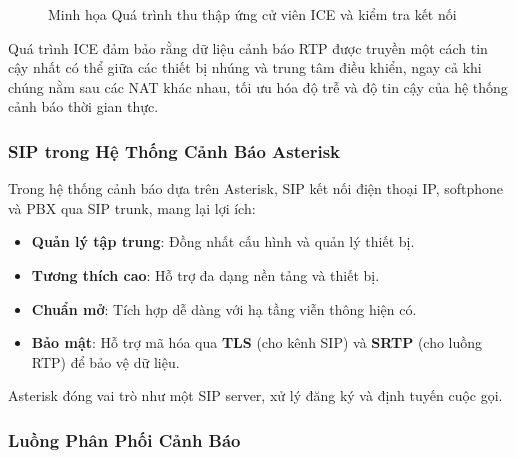 \begin{figure}[h]
\caption{Minh họa Quá trình thu thập ứng cử viên ICE và kiểm tra kết nối}
\label{fig:ice_flow_symmetric}
\end{figure}

Quá trình ICE đảm bảo rằng dữ liệu cảnh báo RTP được truyền một cách tin cậy nhất có thể giữa các thiết bị nhúng và trung tâm điều khiển, ngay cả khi chúng nằm sau các NAT khác nhau, tối ưu hóa độ trễ và độ tin cậy của hệ thống cảnh báo thời gian thực.

\subsubsection{SIP trong Hệ Thống Cảnh Báo Asterisk}
\label{subsubsec:sip_asterisk_integration}

Trong hệ thống cảnh báo dựa trên Asterisk, SIP kết nối điện thoại IP, softphone và PBX qua SIP trunk, mang lại lợi ích:

\begin{itemize}
\item \textbf{Quản lý tập trung}: Đồng nhất cấu hình và quản lý thiết bị.
\item \textbf{Tương thích cao}: Hỗ trợ đa dạng nền tảng và thiết bị.
\item \textbf{Chuẩn mở}: Tích hợp dễ dàng với hạ tầng viễn thông hiện có.
\item \textbf{Bảo mật}: Hỗ trợ mã hóa qua \textbf{TLS} (cho kênh SIP) và \textbf{SRTP} (cho luồng RTP) để bảo vệ dữ liệu.
\end{itemize}

Asterisk đóng vai trò như một SIP server, xử lý đăng ký và định tuyến cuộc gọi.

\subsubsection{Luồng Phân Phối Cảnh Báo}
\label{subsubsec:sip_alert_flows}

